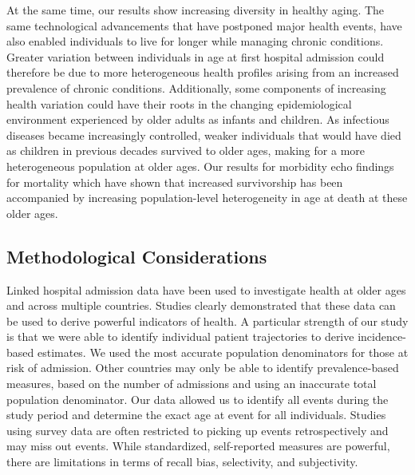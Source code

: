 At the same time, our results show increasing diversity in healthy aging. The 
same technological advancements that have postponed major health events, have 
also enabled individuals to live for longer while managing chronic 
conditions.\citep{gruenberg1977failures,reeves2018challenge,engelman2010implications} 
Greater variation between individuals in age at first hospital admission 
could therefore be due to more heterogeneous health profiles arising from 
an increased prevalence of chronic conditions. Additionally, some components 
of increasing health variation could have their roots in the changing epidemiological 
environment experienced by older adults as infants and children. As infectious 
diseases became increasingly controlled, weaker individuals that would have 
died as children in previous decades survived to older ages, making for a more 
heterogeneous population at older ages.\citep{engelman2010implications} Our 
results for morbidity echo findings for mortality which have shown that increased 
survivorship has been accompanied by increasing population-level heterogeneity 
in age at death at these older ages.\citep{stallard2016compression,engelman2010implications}\\

\subsection{Methodological Considerations}

Linked hospital admission data have been used to investigate health at older 
ages and across multiple countries.\citep{busse2002use,dixon2004hospital,
oksuzyan2013changes} Studies clearly demonstrated that these data can be 
used to derive powerful indicators of health. A particular strength of our 
study is that we were able to identify individual patient trajectories to 
derive incidence-based estimates.\citep{fries2011compression,westergaard2019population} 
We used the most accurate population denominators for those at risk of admission. 
Other countries may only be able to identify prevalence-based measures, based 
on the number of admissions and using an inaccurate total population denominator. 
Our data allowed us to identify all events during the study period and determine 
the exact age at event for all individuals. Studies using survey data are often 
restricted to picking up events retrospectively and may miss out events. While 
standardized, self-reported measures are powerful, there are limitations in 
terms of recall bias, selectivity, and subjectivity.

